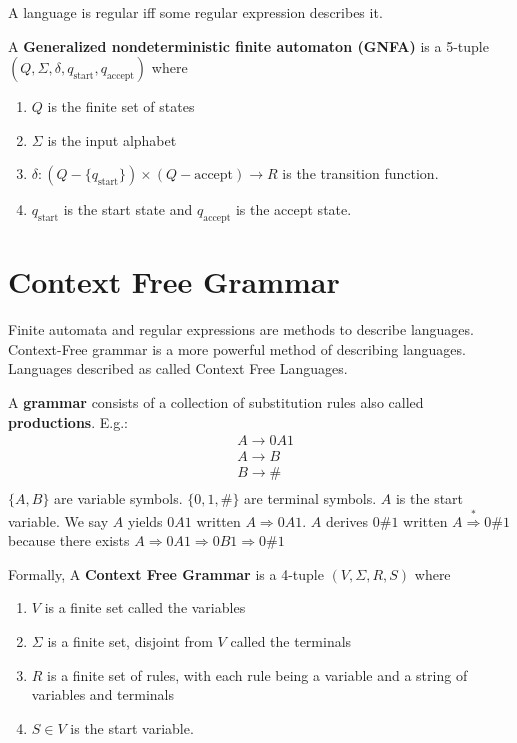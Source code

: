 \documentclass[12pt]{article}
\begin{document}
\begin{theorem}
	A language is regular iff some regular expression describes it.
\end{theorem}

A \textbf{Generalized nondeterministic finite automaton (GNFA)} is a 5-tuple $(Q, \Sigma, \delta, q_{\text{start}}, q_{\text{accept}})$ where \begin{enumerate}
	\item $Q$ is the finite set of states
	\item $\Sigma$ is the input alphabet
	\item $\delta: (Q - \{q_{\text{start}}\}) \times (Q - {\text{accept}}) \longrightarrow R$ is the transition function.
	\item $q_{\text{start}}$ is the start state and $q_{\text{accept}}$ is the accept state.
\end{enumerate}

\section{Context Free Grammar}
Finite automata and regular expressions are methods to describe languages. Context-Free grammar is a more powerful method of describing languages. Languages described as called Context Free Languages.

A \textbf{grammar} consists of a collection of substitution rules also called \textbf{productions}. E.g.:
$$
\begin{aligned}
	&A \rightarrow 0A1 \\
	&A \rightarrow B \\
	&B \rightarrow \# \\
\end{aligned}
$$
$\{A, B\}$ are variable symbols. $\{0, 1, \# \}$ are terminal symbols. $A$ is the start variable. We say $A$ yields $0A1$ written $A \Rightarrow 0A1$. $A$ derives $0\#1$ written $A \stackrel{*}{\Rightarrow} 0\#1$ because there exists $A \Rightarrow 0A1 \Rightarrow 0B1 \Rightarrow 0\#1$

Formally, A \textbf{Context Free Grammar} is a 4-tuple $(V, \Sigma, R, S)$ where
\begin{enumerate}
	\item $V$ is a finite set called the variables
	\item $\Sigma$ is a finite set, disjoint from $V$ called the terminals
	\item  $R$ is a finite set of rules, with each rule being a variable and a string of variables and terminals
	\item $S \in V$ is the start variable.
\end{enumerate}
\end{document}
